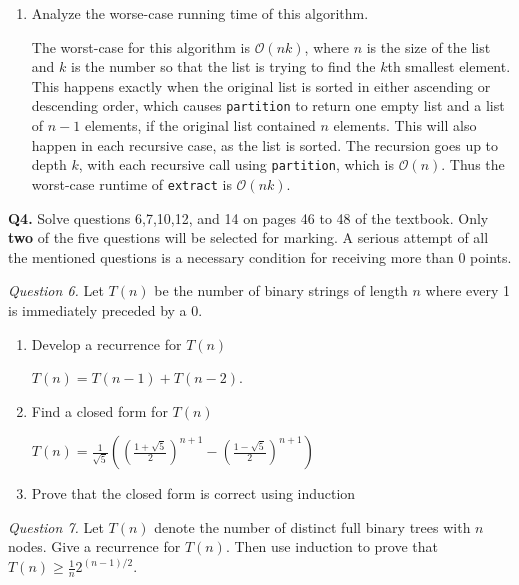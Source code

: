 \documentclass[11pt]{article}
\begin{document}
\begin{enumerate}[label=(\alph*)]
\begin{proof}
            Thus the program returns the correct output for lists of size \(n+1\), and by the principle of complete induction, the program is correct.
            
        \end{proof}
        \item Analyze the worse-case running time of this algorithm.
        
        The worst-case for this algorithm is \(\mathcal{O} (nk)\), where \(n\) is the size of the list and \(k\) is the number so that the list is trying to find the \(k\)th smallest element. This happens exactly when the original list is sorted in either ascending or descending order, which causes \verb|partition| to return one empty list and a list of \(n-1\) elements, if the original list contained \(n\) elements. This will also happen in each recursive case, as the list is sorted. The recursion goes up to depth \(k\), with each recursive call using \verb|partition|, which is \(\mathcal{O} (n)\). Thus the worst-case runtime of \verb|extract| is \(\mathcal{O} (nk)\).
    \end{enumerate}
    \pagebreak
    \textbf{Q4.} Solve questions 6,7,10,12, and 14 on pages 46 to 48 of the textbook. Only \textbf{two} of the five questions will be selected for marking. A serious attempt of all the mentioned questions is a necessary condition for receiving more than 0 points.

    \textit{Question 6.} Let \(T(n)\) be the number of binary strings of length \(n\) where every 1 is immediately preceded by a 0.
    \begin{enumerate}[label=(\alph*)]
        \item Develop a recurrence for \(T(n)\)
        
        \(T(n)=T(n-1)+T(n-2)\).
        \item Find a closed form for \(T(n)\) 
        
        \(T(n)=\frac{1}{\sqrt{5}}\left(\left(\frac{1+\sqrt{5}}{2}\right)^{n+1} - \left(\frac{1-\sqrt{5}}{2}\right)^{n+1}\right)\) 
        \item Prove that the closed form is correct using induction
    \end{enumerate}

    \textit{Question 7.} Let \(T(n)\) denote the number of distinct full binary trees with \(n\) nodes. Give a recurrence for \(T(n)\). Then use induction to prove that \(T(n)\geq \frac{1}{n}2^{(n-1) / 2}\).
\end{document}
